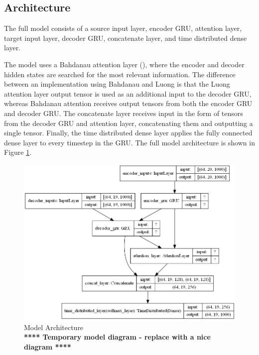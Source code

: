 \subsection{Architecture}

The full model consists of a source input layer, encoder \acrshort{GRU}, attention layer, target input layer, decoder \acrshort{GRU}, concatenate layer, and time distributed dense layer.

The model uses a Bahdanau attention layer (\cite{bahdanau_neural_2016}), where the encoder and decoder hidden states are searched for the most relevant information. The difference between an implementation using Bahdanau and Luong \cite{luong_effective_2015} is that the Luong attention layer output tensor is used as an additional input to the decoder \acrshort{GRU}, whereas Bahdanau attention receives output tensors from both the encoder \acrshort{GRU} and decoder \acrshort{GRU}.
The concatenate layer receives input in the form of tensors from the decoder \acrshort{GRU} and attention layer, concatenating them and outputting a single tensor. Finally, the time distributed dense layer applies the fully connected dense layer to every timestep in the \acrshort{GRU}.
The full model architecture is shown in Figure \ref{fig:model_diagram}.



\begin{figure}[ht!]
\centering
\includegraphics[width=1\textwidth]{media/methodology/model_diagram.png}
\captionsetup{justification=centering,font=Large}
\caption[Diagram of the model architecture]{Model Architecture \\ \textbf{**** Temporary model diagram - replace with a nice diagram ****}}
\label{fig:model_diagram}
\end{figure}

